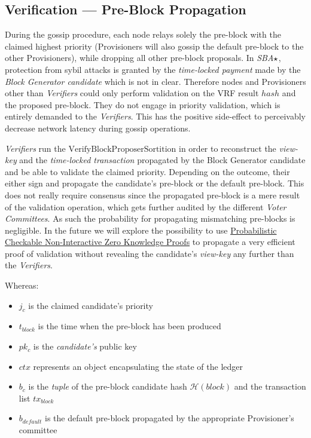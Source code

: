 \subsection{Verification --- Pre-Block Propagation}

During the gossip procedure, each node relays solely the pre-block with
the claimed highest priority (Provisioners will also gossip the default
pre-block to the other Provisioners), while dropping all other pre-block
proposals. In \emph{SBA}\(\large\star\), protection from sybil attacks
is granted by the \emph{time-locked payment} made by the \emph{Block
Generator candidate} which is not in clear. Therefore nodes and
Provisioners other than \emph{Verifiers} could only perform validation
on the VRF result \(hash\) and the proposed pre-block. They do not
engage in priority validation, which is entirely demanded to the
\emph{Verifiers}. This has the positive side-effect to perceivably
decrease network latency during gossip operations.

\emph{Verifiers} run the \(\textrm{VerifyBlockProposerSortition}\) in
order to reconstruct the \emph{view-key} and the \emph{time-locked
transaction} propagated by the Block Generator candidate and be able to
validate the claimed priority. Depending on the outcome, their either
sign and propagate the candidate's pre-block or the default pre-block.
This does not really require consensus since the propagated pre-block is
a mere result of the validation operation, which gets further audited by
the different \emph{Voter Committees}. As such the probability for
propagating mismatching pre-blocks is negligible. In the future we will
explore the possibility to use
\href{https://www.iacr.org/archive/asiacrypt2010/6477343/6477343.pdf}{Probabilistic
Checkable Non-Interactive Zero Knowledge Proofs} to propagate a very
efficient proof of validation without revealing the candidate's
\emph{view-key} any further than the \emph{Verifiers}.

Whereas:

\begin{itemize}
\item
  \(j_c\) is the claimed candidate's priority
\item
  \(t_{block}\) is the time when the pre-block has been produced
\item
  \(pk_c\) is the \emph{candidate's} public key
\item
  \(ctx\) represents an object encapsulating the state of the ledger
\item
  \(b_{c}\) is the \emph{tuple} of the pre-block candidate hash
  \(\mathcal{H}(block)\) and the transaction list \(tx_{block}\)
\item
  \(b_{default}\) is the default pre-block propagated by the appropriate
  Provisioner's committee
\end{itemize}

